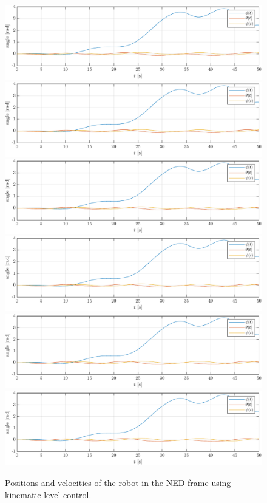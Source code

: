 \begin{figure}[h!]
    \centering
    \includegraphics[page=1,width=\linewidth]{assets/results/kinematic/plot.pdf}
    \includegraphics[page=2,width=\linewidth]{assets/results/kinematic/plot.pdf}
    \includegraphics[page=3,width=\linewidth]{assets/results/kinematic/plot.pdf}
    \includegraphics[page=6,width=\linewidth]{assets/results/kinematic/plot.pdf}
    \includegraphics[page=4,width=\linewidth]{assets/results/kinematic/plot.pdf}
    \includegraphics[page=5,width=\linewidth]{assets/results/kinematic/plot.pdf}
    \caption{Positions and velocities of the robot in the NED frame using kinematic-level control.}
\end{figure}

